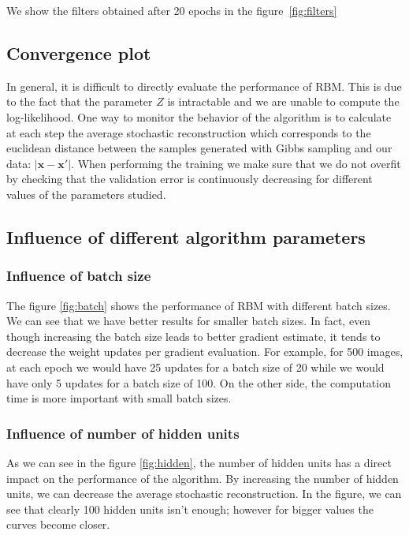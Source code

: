 \documentclass{article}
\begin{document}
We show the filters obtained after 20 epochs in the figure~\ref{fig:filters}

\subsection{Convergence plot}

In general, it is difficult to directly evaluate the performance of RBM. This is due to the fact that the parameter $Z$ is intractable and we are unable to compute the log-likelihood. One way to monitor the behavior of the algorithm is to calculate at each step the average stochastic reconstruction which corresponds to the euclidean distance between the samples generated with Gibbs sampling and our data: $\lvert \mathbf{x} - \mathbf{x'} \rvert$. 
When performing the training we make sure that we do not overfit by checking that the validation error is continuously decreasing for different values of the parameters studied.

\subsection{Influence of different algorithm parameters}

\subsubsection{Influence of batch size}
\label{subsubsec:BS}

The figure \ref{fig:batch} shows the performance of RBM with different batch sizes. We can see that we have better results for smaller batch sizes. In fact, even though increasing the batch size leads to better gradient estimate, it tends to decrease the weight updates per gradient evaluation. For example, for 500 images, at each epoch we would have 25 updates for a batch size of 20 while we would have only 5 updates for a batch size of 100. On the other side, the computation time is more important with small batch sizes.



\subsubsection{Influence of number of hidden units}

As we can see in the figure \ref{fig:hidden}, the number of hidden units has a direct impact on the performance of the algorithm. By increasing the number of hidden units, we can decrease the average stochastic reconstruction. In the figure, we can see that clearly 100 hidden units isn't enough; however for bigger values the curves become closer. 
\end{document}
